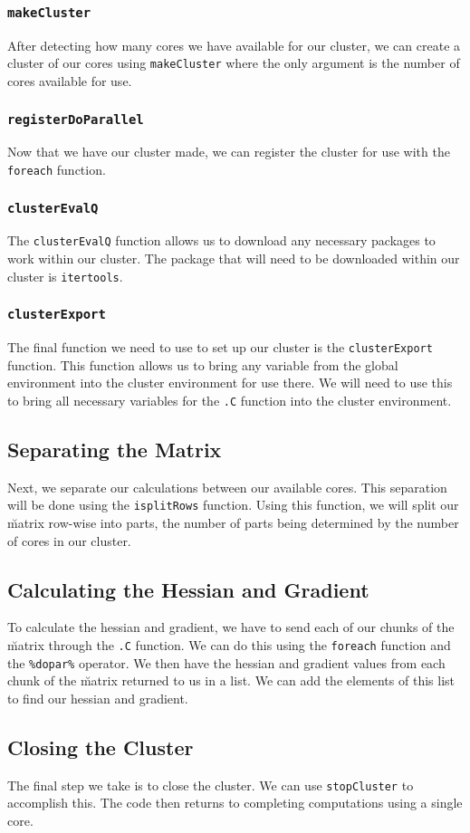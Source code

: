 \documentclass{article}
\begin{document}
\subsubsection{\texttt{makeCluster}}
After detecting how many cores we have available for our cluster, we can create a cluster of our cores using \texttt{makeCluster} where the only argument is the number of cores available for use. 

\subsubsection{\texttt{registerDoParallel}}
Now that we have our cluster made, we can register the cluster for use with the \texttt{foreach} function.

\subsubsection{\texttt{clusterEvalQ}}
The \texttt{clusterEvalQ} function allows us to download any necessary packages to work within our cluster. The package that will need to be downloaded within our cluster is \texttt{itertools}.

\subsubsection{\texttt{clusterExport}}
The final function we need to use to set up our cluster is the \texttt{clusterExport} function. This function allows us to bring any variable from the global environment into the cluster environment for use there. We will need to use this to bring all necessary variables for the \texttt{.C} function into the cluster environment.

\subsection{Separating the Matrix}
Next, we separate our calculations between our available cores. This separation will be done using the \texttt{isplitRows} function. Using this function, we will split our \u matrix row-wise into parts, the number of parts being determined by the number of cores in our cluster.

\subsection{Calculating the Hessian and Gradient}
To calculate the hessian and gradient, we have to send each of our chunks of the \u matrix through the \texttt{.C} function. We can do this using the \texttt{foreach} function and the \texttt{\%dopar\%} operator. We then have the hessian and gradient values from each chunk of the \u matrix returned to us in a list. We can add the elements of this list to find our hessian and gradient.

\subsection{Closing the Cluster}
The final step we take is to close the cluster. We can use \texttt{stopCluster} to accomplish this. The code then returns to completing computations using a single core. 
\end{document}
